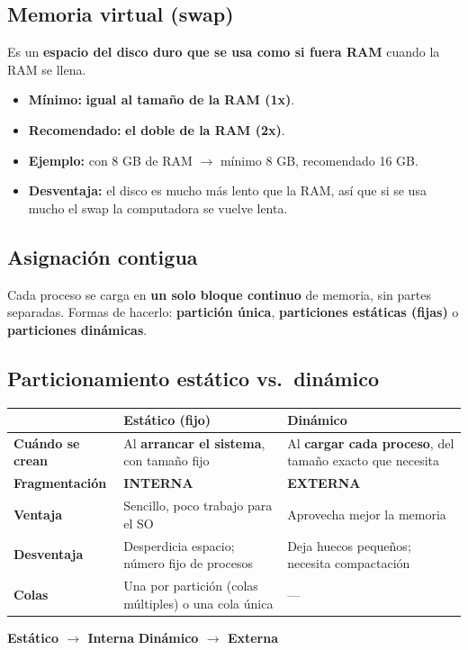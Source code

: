 \documentclass[11pt,a4paper]{article}
\newcommand{\clave}[1]{\textbf{\color{acento}#1}}
\begin{document}
\subsection{Memoria virtual (swap)}
Es un \clave{espacio del disco duro que se usa como si fuera RAM} cuando la RAM se llena.
\begin{itemize}
  \item \textbf{Mínimo:} \clave{igual al tamaño de la RAM (1x)}.
  \item \textbf{Recomendado:} \clave{el doble de la RAM (2x)}.
  \item \textbf{Ejemplo:} con 8 GB de RAM $\rightarrow$ mínimo 8 GB, recomendado 16 GB.
  \item \textbf{Desventaja:} el disco es mucho más lento que la RAM, así que si se usa mucho el swap la computadora se vuelve lenta.
\end{itemize}

\subsection{Asignación contigua}
Cada proceso se carga en \clave{un solo bloque continuo} de memoria, sin partes separadas.
Formas de hacerlo: \textbf{partición única}, \textbf{particiones estáticas (fijas)} o \textbf{particiones dinámicas}.

\subsection{Particionamiento estático vs.\ dinámico}
\begin{tabularx}{\linewidth}{>{\raggedright\bfseries}p{3.2cm}LL}
\toprule
 & Estático (fijo) & Dinámico \\
\midrule
Cuándo se crean & Al \textbf{arrancar el sistema}, con tamaño fijo & Al \textbf{cargar cada proceso}, del tamaño exacto que necesita \\
Fragmentación & \clave{INTERNA} & \clave{EXTERNA} \\
Ventaja & Sencillo, poco trabajo para el SO & Aprovecha mejor la memoria \\
Desventaja & Desperdicia espacio; número fijo de procesos & Deja huecos pequeños; necesita compactación \\
Colas & Una por partición (colas múltiples) o una cola única & --- \\
\bottomrule
\end{tabularx}
\begin{truco}
\textbf{Estático $\rightarrow$ Interna} \qquad \textbf{Dinámico $\rightarrow$ Externa}
\end{truco}
\end{document}
